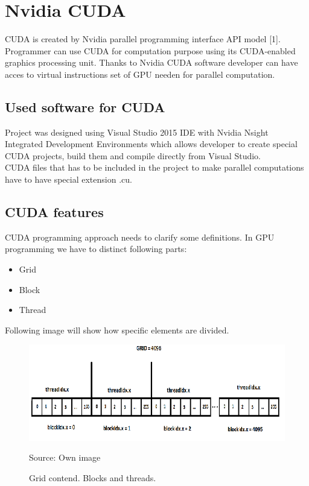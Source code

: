 \documentclass{scrreprt}
\begin{document}
\chapter{Nvidia CUDA}

CUDA is created by Nvidia parallel programming interface API model [1]. Programmer can use CUDA for computation purpose using its CUDA-enabled graphics processing unit. Thanks to Nvidia CUDA software developer can have acces to virtual instructions set of GPU needen for parallel computation.

\section{Used software for CUDA}
Project was designed using Visual Studio 2015 IDE with Nvidia Nsight Integrated Development Environments which allows developer to create special CUDA projects, build them and compile directly from Visual Studio.
\\
CUDA files that has to be included in the project to make parallel computations have to have special extension .cu.




\section{CUDA features}
CUDA programming approach needs to clarify some definitions. In GPU programming we have to distinct following parts:
\\

\begin{itemize}
	\item Grid
	\item Block
	\item Thread
\end{itemize}  

Following image will show how specific elements are divided.

\begin{figure}[h!]
\centering
\includegraphics{CUDABlocksAndThreads.png}
\caption{Grid contend. Blocks and threads.}
Source: Own image
\end{figure}
\FloatBarrier
\end{document}
